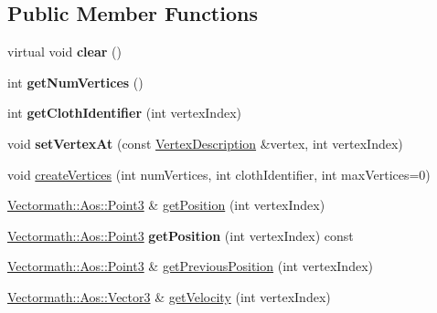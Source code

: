 \subsection*{Public Member Functions}
\begin{DoxyCompactItemize}
\item 
\mbox{\label{classbtSoftBodyVertexData_aff881f14a4ae961dd8420969e1115090}} 
virtual void {\bfseries clear} ()
\item 
\mbox{\label{classbtSoftBodyVertexData_a701997d46cf9d90f0cd22abda13d572c}} 
int {\bfseries get\+Num\+Vertices} ()
\item 
\mbox{\label{classbtSoftBodyVertexData_acfc7cafd9b13f9c442af038ca8e08dfc}} 
int {\bfseries get\+Cloth\+Identifier} (int vertex\+Index)
\item 
\mbox{\label{classbtSoftBodyVertexData_a3dc301457df55b2da8bd7aea67eea552}} 
void {\bfseries set\+Vertex\+At} (const \hyperlink{classbtSoftBodyVertexData_1_1VertexDescription}{Vertex\+Description} \&vertex, int vertex\+Index)
\item 
void \hyperlink{classbtSoftBodyVertexData_ac3ec63020379a29c984904deb4fc92b2}{create\+Vertices} (int num\+Vertices, int cloth\+Identifier, int max\+Vertices=0)
\item 
\hyperlink{classVectormath_1_1Aos_1_1Point3}{Vectormath\+::\+Aos\+::\+Point3} \& \hyperlink{classbtSoftBodyVertexData_ac5d2dd4b383b386080c45a4fcf45f4f4}{get\+Position} (int vertex\+Index)
\item 
\mbox{\label{classbtSoftBodyVertexData_a9bc7e8a411d49f5ab968666788dce5cf}} 
\hyperlink{classVectormath_1_1Aos_1_1Point3}{Vectormath\+::\+Aos\+::\+Point3} {\bfseries get\+Position} (int vertex\+Index) const
\item 
\hyperlink{classVectormath_1_1Aos_1_1Point3}{Vectormath\+::\+Aos\+::\+Point3} \& \hyperlink{classbtSoftBodyVertexData_a123a978bf93f1ea06263b157e433ad97}{get\+Previous\+Position} (int vertex\+Index)
\item 
\hyperlink{classVectormath_1_1Aos_1_1Vector3}{Vectormath\+::\+Aos\+::\+Vector3} \& \hyperlink{classbtSoftBodyVertexData_ae2283fd9cc23dcaff3721fbcf26e3bad}{get\+Velocity} (int vertex\+Index)
\item 

\end{DoxyCompactItemize}
